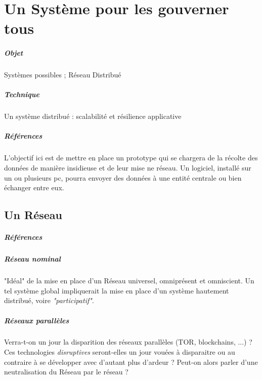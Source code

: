 \chapter{Un Système pour les gouverner tous}
\paragraph{Objet} Systèmes possibles ; Réseau Distribué
\paragraph{Technique} Un système distribué : scalabilité et résilience applicative
\paragraph{Références}
\cite{Deleuze:0}
\cite{Foucault:0}
\cite{Negri:0}
\cite{Pieces:0}
\cite{ProgrammableCity:0}
\cite{ProgrammableCity:1}
\cite{PsychoPass}

L'objectif ici est de mettre en place un prototype qui se chargera de la récolte des données
de manière insidieuse et de leur mise ne réseau. Un logiciel, installé sur un ou plusieurs pc,
pourra envoyer des données à une entité centrale ou bien échanger entre eux.

\section{Un Réseau}
\paragraph{Références} \cite{DarkWeb:0}

\paragraph{Réseau \emph{nominal}} "Idéal" de la mise en place d'un Réseau universel, omniprésent
et omniscient. Un tel système global impliquerait la mise en place d'un système hautement
distribué, voire \emph{"participatif"}.

\paragraph{Réseaux parallèles} Verra-t-on un jour la disparition des réseaux parallèles
(TOR, blockchains, ...) ? Ces technologies \emph{disruptives} seront-elles un jour vouées
à disparaitre ou au contraire à se développer avec d'autant plus d'ardeur ? Peut-on alors
parler d'une neutralisation du Réseau par le réseau ?



